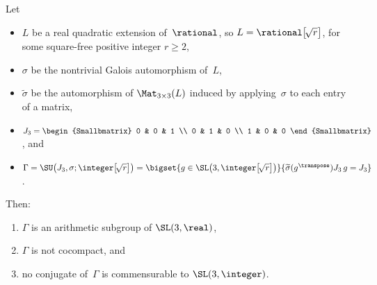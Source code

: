 \begin{prop} \label{NoncocpctInSL3Eg}
 Let
 \begin{itemize}
 \item $L$ be a real quadratic extension of\/~$\rational$, so
$L = \rational\bigl[\! \sqrt{r} \bigr]$, for some square-free positive
integer $r \ge 2$,
 \item $\sigma$ be the nontrivial Galois automorphism of~$L$,
 \item $\widetilde\sigma$ be the automorphism of\/ $\Mat_{3
\times 3}(L)$ induced by applying~$\sigma$ to each entry
of a matrix,
 \item $J_3 = 
 \begin{Smallbmatrix}
 0 & 0 & 1 \\
 0 & 1 & 0 \\
 1 & 0 & 0
 \end{Smallbmatrix}$,
 and
 \item $\Gamma = \SU \bigl( J_3, \sigma; \integer \bigl[\! \sqrt{r}
\bigr] \bigr)
 = 
 \bigset{
 g \in \SL \bigl( 3, \integer \bigl[\! \sqrt{r} \bigr] \bigr)
 }{
 \widetilde\sigma(g^{\transpose}) J_3 \, g = J_3
 }$.
 \end{itemize}
 Then:
 \begin{enumerate}
 \item \label{NoncocpctInSL3Eg-latt}
 $\Gamma$ is an arithmetic subgroup of\/ $\SL(3,\real)$,
 \item \label{NoncocpctInSL3Eg-noncocpct}
 $\Gamma$ is not cocompact, and
 \item \label{NoncocpctInSL3Eg-Qrank}
 no conjugate of\/~$\Gamma$ is commensurable to\/ $\SL(3,\integer)$.
 \end{enumerate}
 \end{prop}

